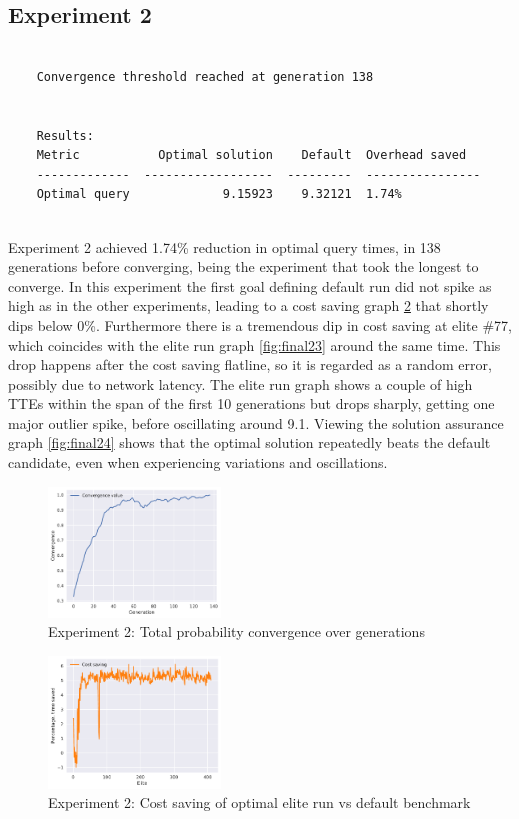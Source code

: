 \documentclass[a4paper,english]{report}
\begin{document}
	\subsection{Experiment 2}
	\begin{verbatim}
	
	Convergence threshold reached at generation 138
	
	
	Results:
	Metric           Optimal solution    Default  Overhead saved
	-------------  ------------------  ---------  ----------------
	Optimal query             9.15923    9.32121  1.74%
	
	\end{verbatim}
	Experiment 2 achieved 1.74\% reduction in optimal query times, in 138 generations before converging, being the experiment that took the longest to converge. In this experiment the first goal defining default run did not spike as high as in the other experiments, leading to a cost saving graph \ref{fig:final22} that shortly dips below 0\%. Furthermore there is a tremendous dip in cost saving at elite \#77, which coincides with the elite run graph \ref{fig:final23} around the same time. This drop happens after the cost saving flatline, so it is regarded as a random error, possibly due to network latency. The elite run graph shows a couple of high TTEs within the span of the first 10 generations but drops sharply, getting one major outlier spike, before oscillating around 9.1. Viewing the solution assurance graph \ref{fig:final24} shows that the optimal solution repeatedly beats the default candidate, even when experiencing variations and oscillations.
	\clearpage
	\begin{figure}[H]
		\centering
		\includegraphics[width=130pt]{runlogs/final2/1}
		\caption{Experiment 2: Total probability convergence over generations}
		\label{fig:final21}
	\end{figure}
	\begin{figure}[H]
		\centering
		\includegraphics[width=130pt]{runlogs/final2/2}
		\caption{Experiment 2: Cost saving of optimal elite run vs default benchmark}
		\label{fig:final22}
	\end{figure}
\end{document}
